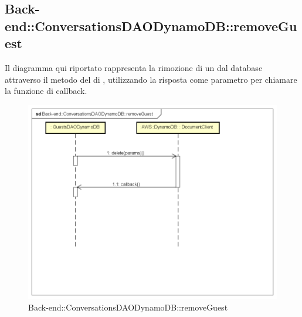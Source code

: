 \subsection{Back-end::ConversationsDAODynamoDB::removeGuest}
Il diagramma qui riportato rappresenta la rimozione di un  dal database attraverso il metodo  del  di , utilizzando la risposta come parametro per chiamare la funzione di callback.
 \begin{figure}[h] \centering \includegraphics[width=\textwidth,height=\textheight,keepaspectratio]{images/diagrams/back-end/Ufficial_Backend/Back-endConversationsDAODynamoDBremoveGuest.png} 	\caption{Back-end::ConversationsDAODynamoDB::removeGuest}
\end{figure}

\newpage

